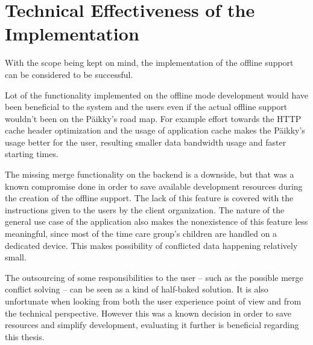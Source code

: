\section{Technical Effectiveness of the Implementation}





With the scope being kept on mind, the implementation of the offline support can be considered to be successful. 

Lot of the functionality implemented on the offline mode development would have been beneficial to the system and the users even if the actual offline support wouldn't been on the Päikky's road map. For example effort towards the HTTP cache header optimization and the usage of application cache makes the Päikky's usage better for the user, resulting smaller data bandwidth usage and faster starting times.

The missing merge functionality on the backend is a downside, but that was a known compromise done in order to save available development resources during the creation of the offline support. The lack of this feature is covered with the instructions given to the users by the client organization. The nature of the general use case of the application also makes the nonexistence of this feature less meaningful, since most of the time care group's children are handled on a dedicated device. This makes possibility of conflicted data happening relatively small.

The outsourcing of some responsibilities to the user – such as the possible merge conflict solving – can be seen as a kind of half-baked solution. It is also unfortunate when looking from both the user experience point of view and from the technical perspective. However this was a known decision in order to save resources and simplify development, evaluating it further is beneficial regarding this thesis.

